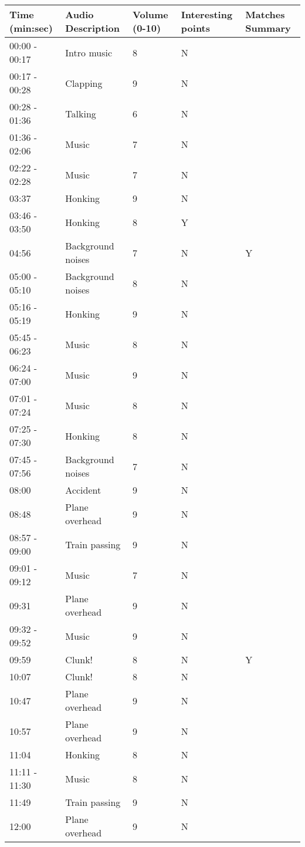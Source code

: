 \begin{longtable}{| p{70pt} | p{130pt} | p{45pt} | p{57pt} | p{60pt}|}
\hline
\textbf{Time (min:sec)} & \textbf{Audio Description} & \textbf{Volume (0-10)} &\textbf{ Interesting points} & \textbf{Matches Summary}\\ \hline
00:00 - 00:17 & Intro music & 8 & N&\\\hline
00:17 - 00:28 & Clapping & 9 & N&\\\hline
00:28 - 01:36 & Talking & 6 & N&\\\hline
01:36 - 02:06 & Music & 7 & N&\\\hline
02:22 - 02:28 & Music & 7 & N&\\\hline
03:37 & Honking & 9 & N&\\\hline
03:46 - 03:50 & Honking & 8 & Y&\\\hline
04:56 & Background noises & 7 & N&Y\\\hline
05:00 - 05:10 & Background noises & 8 & N&\\\hline
05:16 - 05:19 & Honking & 9 & N&\\\hline
05:45 - 06:23 & Music & 8 & N&\\\hline
06:24 - 07:00 & Music & 9 & N&\\\hline
07:01 - 07:24 & Music & 8 & N&\\\hline
07:25 - 07:30 & Honking & 8 & N&\\\hline
07:45 - 07:56 & Background noises & 7 & N&\\\hline
08:00 & Accident & 9 & N&\\\hline
08:48 & Plane overhead & 9 & N&\\\hline
08:57 - 09:00 & Train passing & 9 & N&\\\hline
09:01 - 09:12 & Music & 7 & N&\\\hline
09:31 & Plane overhead & 9 & N&\\\hline
09:32 - 09:52 & Music & 9 & N&\\\hline
09:59 & Clunk! & 8 & N&Y\\\hline
10:07 & Clunk! & 8 & N&\\\hline
10:47 & Plane overhead & 9 & N&\\\hline
10:57 & Plane overhead & 9 & N&\\\hline
11:04 & Honking & 8 & N&\\\hline
11:11 - 11:30 & Music & 8 & N&\\\hline
11:49 & Train passing & 9 & N&\\\hline
12:00 & Plane overhead & 9 & N&\\\hline

\end{longtable}
